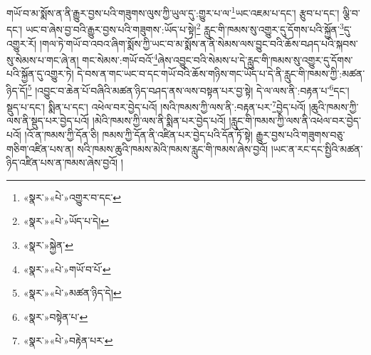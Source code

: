 གཡོ་བ་མ་སྨོས་ན་ནི་རྒྱུར་བྱས་པའི་གཟུགས་ལུས་ཀྱི་ཡུལ་དུ་:གྱུར་པ་ལ་\footnote{«སྣར་»«པེ་»འགྱུར་བ་དང་}ཡང་འཇམ་པ་དང་། རྩུབ་པ་དང་། ལྕི་བ་དང་། ཡང་བ་ཞེས་བྱ་བའི་རྒྱུར་བྱས་པའི་གཟུགས་:ཡོད་པ་སྟེ།\footnote{«སྣར་»«པེ་»ཡོད་པ་དེ།} རླུང་གི་ཁམས་སུ་འགྱུར་དུ་དོགས་པའི་སྐྱོན་\footnote{«སྣར་»སྐྱེན་}དུ་འགྱུར་རོ། །གལ་ཏེ་གཡོ་བ་འབའ་ཞིག་སྨོས་ཀྱི་ཡང་བ་མ་སྨོས་ན་ནི་སེམས་ལས་བྱུང་བའི་ཆོས་བཤད་པའི་སྐབས་སུ་སེམས་པ་གང་ཞེ་ན། གང་སེམས་:གཡོ་བའོ་\footnote{«སྣར་»«པེ་»གཡོ་བ་པོ་}ཞེས་འབྱུང་བའི་སེམས་པ་དེ་རླུང་གི་ཁམས་སུ་འགྱུར་དུ་དོགས་པའི་སྐྱོན་དུ་འགྱུར་ཏེ། དེ་བས་ན་གང་ཡང་བ་དང་གཡོ་བའི་ཆོས་གཉིས་གང་ཡོད་པ་དེ་ནི་རླུང་གི་ཁམས་ཀྱི་:མཚན་ཉིད་དོ།\footnote{«སྣར་»«པེ་»མཚན་ཉིད་དེ།} །འབྱུང་བ་ཆེན་པོ་བཞིའི་མཚན་ཉིད་བཤད་ནས་ལས་བསྟན་པར་བྱ་སྟེ། དེ་ལ་ལས་ནི་:བརྟན་པ་\footnote{«སྣར་»བསྟེན་པ་}དང་། སྡུད་པ་དང་། སྨིན་པ་དང་། འཕེལ་བར་བྱེད་པའོ། །སའི་ཁམས་ཀྱི་ལས་ནི་:བརྟན་པར་\footnote{«སྣར་»«པེ་»བརྟེན་པར་}བྱེད་པའོ། །ཆུའི་ཁམས་ཀྱི་ལས་ནི་སྡུད་པར་བྱེད་པའོ། །མེའི་ཁམས་ཀྱི་ལས་ནི་སྨིན་པར་བྱེད་པའོ། །རླུང་གི་ཁམས་ཀྱི་ལས་ནི་འཕེལ་བར་བྱེད་པའོ། །འོ་ན་ཁམས་ཀྱི་དོན་ཅི། ཁམས་ཀྱི་དོན་ནི་འཛིན་པར་བྱེད་པའི་དོན་ཏོ་སྟེ། རྒྱུར་བྱས་པའི་གཟུགས་བཅུ་གཅིག་འཛིན་པས་ན། སའི་ཁམས་ཆུའི་ཁམས་མེའི་ཁམས་རླུང་གི་ཁམས་ཞེས་བྱའོ། །ཡང་ན་རང་དང་སྤྱིའི་མཚན་ཉིད་འཛིན་པས་ན་ཁམས་ཞེས་བྱའོ། །
